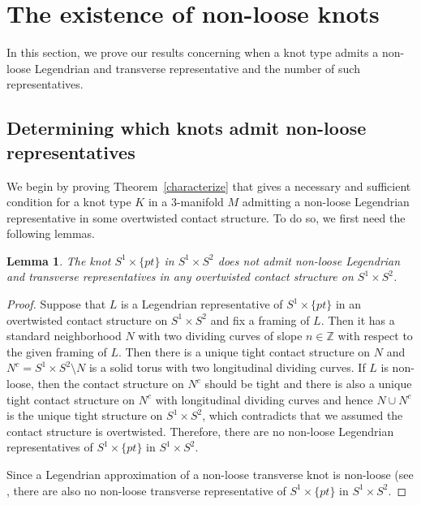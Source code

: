 \documentclass[11pt]{amsart}
\theoremstyle{plain}
\newtheorem{lemma}[theorem]{Lemma}
\theoremstyle{definition}
\theoremstyle{remark}
\numberwithin{theorem}{section}
\begin{document}
\section{The existence of non-loose knots}

In this section, we prove our results concerning when a knot type admits a non-loose Legendrian and transverse representative and the number of such representatives. 

\subsection{Determining which knots admit non-loose representatives} We begin by proving Theorem~\ref{characterize} that gives a necessary and sufficient condition for a knot type $K$ in a $3$-manifold $M$ admitting a non-loose Legendrian representative in some overtwisted contact structure. To do so, we first need the following lemmas.

\begin{lemma}\label{lem:s1s2}
  The knot $S^1\times \{pt\}$ in $S^1 \times S^2$ does not admit non-loose Legendrian and transverse representatives in any overtwisted contact structure on $S^1 \times S^2$.
\end{lemma}

\begin{proof}
  Suppose that $L$ is a Legendrian representative of $S^1 \times \{pt\}$ in an overtwisted contact structure on $S^1 \times S^2$ and fix a framing of $L$. Then it has a standard neighborhood $N$ with two dividing curves of slope $n \in \mathbb{Z}$ with respect to the given framing of $L$. Then there is a unique tight contact structure on $N$ and $N^c = S^1\times S^2 \setminus N$ is a solid torus with two longitudinal dividing curves. If $L$ is non-loose, then the contact structure on $N^c$ should be tight and there is also a unique tight contact structure on $N^c$ with longitudinal dividing curves and hence $N\cup N^c$ is the unique tight structure on $S^1\times S^2$, which contradicts that we assumed the contact structure is overtwisted. Therefore, there are no non-loose Legendrian representatives of $S^1\times \{pt\}$ in $S^1\times S^2$. 

  Since a Legendrian approximation of a non-loose transverse knot is non-loose (see \cite[Proposition~1.2]{Etnyre13}, there are also no non-loose transverse representative of $S^1\times \{pt\}$ in $S^1\times S^2$.
\end{proof}
\end{document}
